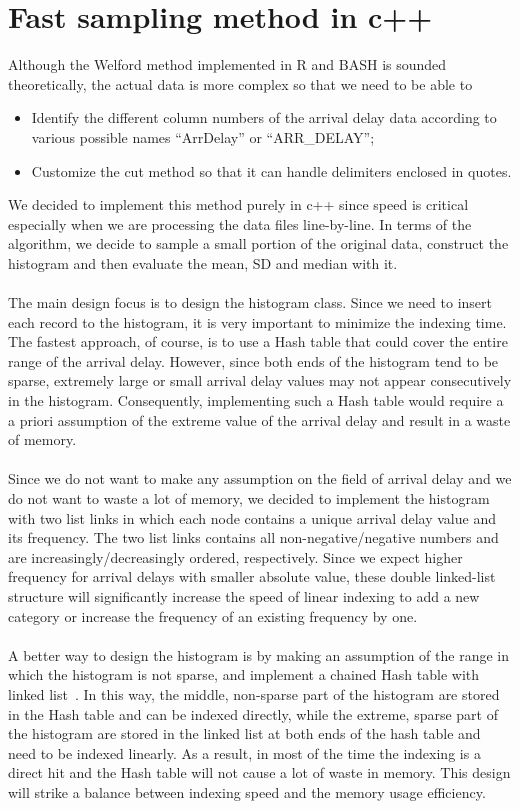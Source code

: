 \documentclass{article}
\begin{document}
\section{Fast sampling method in c++}
Although the Welford method implemented in R and BASH is sounded theoretically, the actual data is more complex so that we need to be able to
\begin{itemize}
    \item Identify the different column numbers of the arrival delay data according to various possible names ``ArrDelay'' or ``ARR\_DELAY'';
    \item Customize the cut method so that it can handle delimiters enclosed in quotes.
\end{itemize}
We decided to implement this method purely in c++ since speed is critical especially when we are processing the data files line-by-line. In terms of the algorithm, we decide to sample a small portion of the original data, construct the histogram and then evaluate the mean, SD and median with it.
\\\\
The main design focus is to design the histogram class. Since we need to insert each record to the histogram, it is very important to minimize the indexing time. The fastest approach, of course, is to use a Hash table that could cover the entire range of the arrival delay. However, since both ends of the histogram tend to be sparse, extremely large or small arrival delay values may not appear consecutively in the histogram. Consequently, implementing such a Hash table would require a a priori assumption of the extreme value of the arrival delay and result in a waste of memory.
\\\\
Since we do not want to make any assumption on the field of arrival delay and we do not want to waste a lot of  memory, we decided to implement the histogram with two list links in which each node contains a unique arrival delay value and its frequency. The two list links contains all non-negative/negative numbers and are increasingly/decreasingly ordered, respectively. Since we expect higher frequency for arrival delays with smaller absolute value, these double linked-list structure will significantly increase the speed of linear indexing to add a new category or increase the frequency of an existing frequency by one.
\\\\
A better way to design the histogram is by making an assumption of the range in which the histogram is not sparse, and implement a chained Hash table with linked list~\cite{ChainedHash}. In this way, the middle, non-sparse part of the histogram are stored in the Hash table and can be indexed directly, while the extreme, sparse part of the histogram are stored in the linked list at both ends of the hash table and need to be indexed linearly. As a result, in most of the time the indexing is a direct hit and the Hash table will not cause a lot of waste in memory. This design will strike a balance between indexing speed and the memory usage efficiency.
\end{document}
